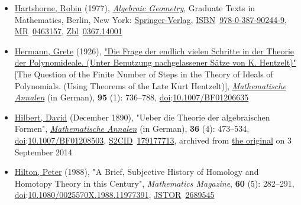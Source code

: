 \begin{itemize}
\item
  \href{https://en.wikipedia.org/wiki/Robin_Hartshorne}{Hartshorne, Robin} (1977), \href{https://en.wikipedia.org/wiki/Algebraic_Geometry_(book)}{\emph{Algebraic Geometry}}, Graduate Texts in Mathematics, Berlin, New York: \href{https://en.wikipedia.org/wiki/Springer-Verlag}{Springer-Verlag}, \href{https://en.wikipedia.org/wiki/ISBN_(identifier)}{ISBN}{~}\href{https://en.wikipedia.org/wiki/Special:BookSources/978-0-387-90244-9}{978-0-387-90244-9}, \href{https://en.wikipedia.org/wiki/MR_(identifier)}{MR}{~}\href{https://mathscinet.ams.org/mathscinet-getitem?mr=0463157}{0463157}, \href{https://en.wikipedia.org/wiki/Zbl_(identifier)}{Zbl}{~}\href{https://zbmath.org/?format=complete&q=an:0367.14001}{0367.14001}{}
\item
  \href{https://en.wikipedia.org/wiki/Grete_Hermann}{Hermann, Grete} (1926), \href{http://gdz.sub.uni-goettingen.de/dms/resolveppn/?PPN=GDZPPN002270935}{"Die Frage der endlich vielen Schritte in der Theorie der Polynomideale. (Unter Benutzung nachgelassener Sätze von K. Hentzelt)"} {{[}}The Question of the Finite Number of Steps in the Theory of Ideals of Polynomials. (Using Theorems of the Late Kurt Hentzelt){{]}}, \emph{\href{https://en.wikipedia.org/wiki/Mathematische_Annalen}{Mathematische Annalen}} (in German), \textbf{95} (1): {736--}788, \href{https://en.wikipedia.org/wiki/Doi_(identifier)}{doi}:\href{https://doi.org/10.1007\%2FBF01206635}{10.1007/BF01206635}{}
\item
  \href{https://en.wikipedia.org/wiki/David_Hilbert}{Hilbert, David} (December 1890), "Ueber die Theorie der algebraischen Formen", \emph{\href{https://en.wikipedia.org/wiki/Mathematische_Annalen}{Mathematische Annalen}} (in German), \textbf{36} (4): {473--}534, \href{https://en.wikipedia.org/wiki/Doi_(identifier)}{doi}:\href{https://doi.org/10.1007\%2FBF01208503}{10.1007/BF01208503}, \href{https://en.wikipedia.org/wiki/S2CID_(identifier)}{S2CID}{~}\href{https://api.semanticscholar.org/CorpusID:179177713}{179177713}, archived from \href{http://gdz.sub.uni-goettingen.de/index.php?id=11&PPN=PPN235181684_0036&DMDID=DMDLOG_0045&L=1}{the original} on 3 September 2014{}
\item
  \href{https://en.wikipedia.org/wiki/Peter_Hilton}{Hilton, Peter} (1988), "A Brief, Subjective History of Homology and Homotopy Theory in this Century", \emph{Mathematics Magazine}, \textbf{60} (5): {282--}291, \href{https://en.wikipedia.org/wiki/Doi_(identifier)}{doi}:\href{https://doi.org/10.1080\%2F0025570X.1988.11977391}{10.1080/0025570X.1988.11977391}, \href{https://en.wikipedia.org/wiki/JSTOR_(identifier)}{JSTOR}{~}\href{https://www.jstor.org/stable/2689545}{2689545}{}

\end{itemize}
